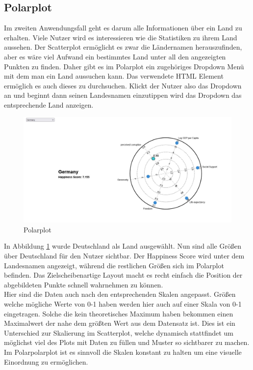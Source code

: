 \subsection{Polarplot}

Im zweiten Anwendungsfall geht es darum alle Informationen über ein Land zu erhalten. Viele Nutzer wird es interessieren wie die Statistiken zu ihrem Land aussehen. Der Scatterplot ermöglicht es zwar die Ländernamen herauszufinden, aber es wäre viel Aufwand ein bestimmtes Land unter all den angezeigten Punkten zu finden. Daher gibt es im Polarplot ein zugehöriges Dropdown Menü mit dem man ein Land aussuchen kann. Das verwendete HTML Element ermöglich es auch dieses zu durchsuchen. Klickt der Nutzer also das Dropdown an und beginnt dann seinen Landesnamen einzutippen wird das Dropdown das entsprechende Land anzeigen. \\

\begin{figure}[h]
 \centering
 \includegraphics[width = \textwidth]{img/polarplot.jpg}
 \caption{Polarplot}
 \label{fig:polar_example}
\end{figure}

In Abbildung \ref{fig:polar_example} wurde Deutschland als Land ausgewählt. Nun sind alle Größen über Deutschland für den Nutzer sichtbar. Der Happiness Score wird unter dem Landesnamen angezeigt, während die restlichen Größen sich im Polarplot befinden. Das Zielscheibenartige Layout macht es recht einfach die Position der abgebildeten Punkte schnell wahrnehmen zu können. \\

Hier sind die Daten auch nach den entsprechenden Skalen angepasst. Größen welche mögliche Werte von 0-1 haben werden hier auch auf einer Skala von 0-1 eingetragen. Solche die kein theoretisches Maximum haben bekommen einen Maximalwert der nahe dem größten Wert aus dem Datensatz ist. Dies ist ein Unterschied zur Skalierung im Scatterplot, welche dynamisch stattfindet um möglichst viel des Plots mit Daten zu füllen und Muster so sichtbarer zu machen. Im Polarpolarplot ist es sinnvoll die Skalen konstant zu halten um eine visuelle Einordnung zu ermöglichen.

